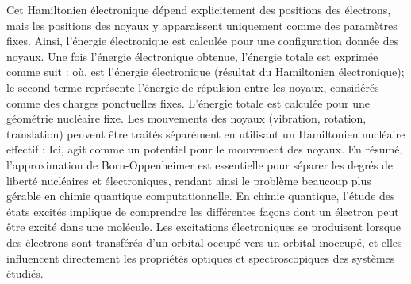 {}Cet Hamiltonien électronique dépend explicitement des positions des électrons, mais les positions des noyaux y apparaissent uniquement comme des paramètres fixes. Ainsi, l'énergie électronique  est calculée pour une configuration donnée des noyaux.\markdownRendererInterblockSeparator
{}
\markdownRendererSectionEnd \markdownRendererSectionBegin
{}\markdownRendererInterblockSeparator
{}Une fois l'énergie électronique obtenue, l'énergie totale est exprimée comme suit :\markdownRendererInterblockSeparator
{}\markdownRendererInterblockSeparator
{}où,\markdownRendererInterblockSeparator
{}\markdownRendererUlBeginTight
\markdownRendererUlItem {} est l'énergie électronique (résultat du Hamiltonien électronique);\markdownRendererUlItemEnd 
\markdownRendererUlItem le second terme représente l'énergie de répulsion entre les noyaux, considérés comme des charges ponctuelles fixes.\markdownRendererUlItemEnd 
\markdownRendererUlEndTight \markdownRendererInterblockSeparator
{}
\markdownRendererSectionEnd \markdownRendererSectionBegin
{}\markdownRendererInterblockSeparator
{}\markdownRendererUlBeginTight
\markdownRendererUlItem L'énergie totale est calculée pour une géométrie nucléaire fixe.\markdownRendererUlItemEnd 
\markdownRendererUlItem Les mouvements des noyaux (vibration, rotation, translation) peuvent être traités séparément en utilisant un Hamiltonien nucléaire effectif :\markdownRendererUlItemEnd 
\markdownRendererUlEndTight \markdownRendererInterblockSeparator
{}\markdownRendererInterblockSeparator
{}Ici,  agit comme un potentiel pour le mouvement des noyaux.\markdownRendererParagraphSeparator
{}En résumé, l'approximation de Born-Oppenheimer est essentielle pour séparer les degrés de liberté nucléaires et électroniques, rendant ainsi le problème beaucoup plus gérable en chimie quantique computationnelle.\markdownRendererParagraphSeparator
{}
\markdownRendererSectionEnd 
\markdownRendererSectionEnd \markdownRendererSectionBegin
{}\markdownRendererInterblockSeparator
{}En chimie quantique, l'étude des états excités implique de comprendre les différentes façons dont un électron peut être excité dans une molécule. Les excitations électroniques se produisent lorsque des électrons sont transférés d'un orbital occupé vers un orbital inoccupé, et elles influencent directement les propriétés optiques et spectroscopiques des systèmes étudiés.\markdownRendererParagraphSeparator
